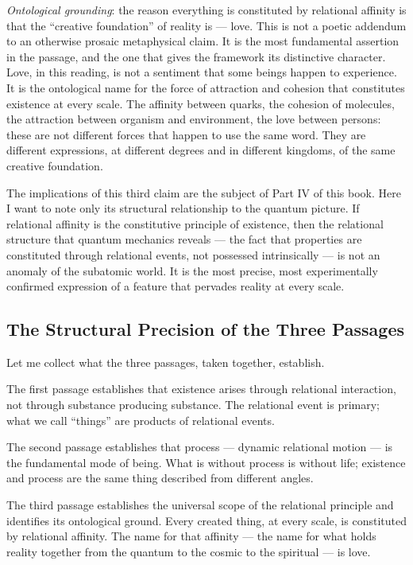 \emph{Ontological grounding}: the reason everything is constituted by relational
affinity is that the ``creative foundation'' of reality is \mahabbat --- love.
This is not a poetic addendum to an otherwise prosaic metaphysical claim.
It is the most fundamental assertion in the passage, and the one that gives the
\bahai framework its distinctive character.
Love, in this reading, is not a sentiment that some beings happen to experience.
It is the ontological name for the force of attraction and cohesion that
constitutes existence at every scale.
The affinity between quarks, the cohesion of molecules, the attraction between
organism and environment, the love between persons: these are not different forces
that happen to use the same word.
They are different expressions, at different degrees and in different kingdoms,
of the same creative foundation.

The implications of this third claim are the subject of Part IV of this book.
Here I want to note only its structural relationship to the quantum picture.
If relational affinity is the constitutive principle of existence, then the
relational structure that quantum mechanics reveals --- the fact that properties
are constituted through relational events, not possessed intrinsically --- is not
an anomaly of the subatomic world.
It is the most precise, most experimentally confirmed expression of a feature
that pervades reality at every scale.

\subsection{The Structural Precision of the Three Passages}

Let me collect what the three passages, taken together, establish.

The first passage establishes that existence arises through relational interaction,
not through substance producing substance.
The relational event is primary; what we call ``things'' are products of relational
events.

The second passage establishes that process --- dynamic relational motion --- is
the fundamental mode of being.
What is without process is without life; existence and process are the same thing
described from different angles.

The third passage establishes the universal scope of the relational principle and
identifies its ontological ground.
Every created thing, at every scale, is constituted by relational affinity.
The name for that affinity --- the name for what holds reality together from the
quantum to the cosmic to the spiritual --- is love.

